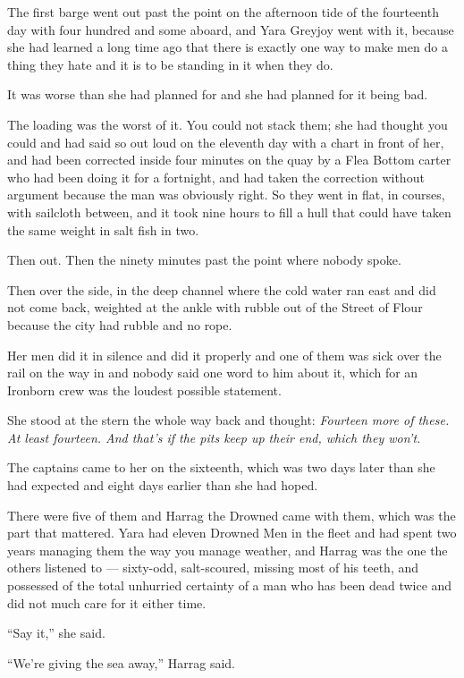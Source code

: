 The first barge went out past the point on the afternoon tide of the fourteenth day with four hundred and some aboard, and Yara Greyjoy went with it, because she had learned a long time ago that there is exactly one way to make men do a thing they hate and it is to be standing in it when they do.

It was worse than she had planned for and she had planned for it being bad.

The loading was the worst of it. You could not stack them; she had thought you could and had said so out loud on the eleventh day with a chart in front of her, and had been corrected inside four minutes on the quay by a Flea Bottom carter who had been doing it for a fortnight, and had taken the correction without argument because the man was obviously right. So they went in flat, in courses, with sailcloth between, and it took nine hours to fill a hull that could have taken the same weight in salt fish in two.

Then out. Then the ninety minutes past the point where nobody spoke.

Then over the side, in the deep channel where the cold water ran east and did not come back, weighted at the ankle with rubble out of the Street of Flour because the city had rubble and no rope.

Her men did it in silence and did it properly and one of them was sick over the rail on the way in and nobody said one word to him about it, which for an Ironborn crew was the loudest possible statement.

She stood at the stern the whole way back and thought: \textit{Fourteen more of these. At least fourteen. And that’s if the pits keep up their end, which they won’t.}

\sceneBreak

The captains came to her on the sixteenth, which was two days later than she had expected and eight days earlier than she had hoped.

There were five of them and Harrag the Drowned came with them, which was the part that mattered. Yara had eleven Drowned Men in the fleet and had spent two years managing them the way you manage weather, and Harrag was the one the others listened to — sixty-odd, salt-scoured, missing most of his teeth, and possessed of the total unhurried certainty of a man who has been dead twice and did not much care for it either time.

“Say it,” she said.

“We’re giving the sea away,” Harrag said.

